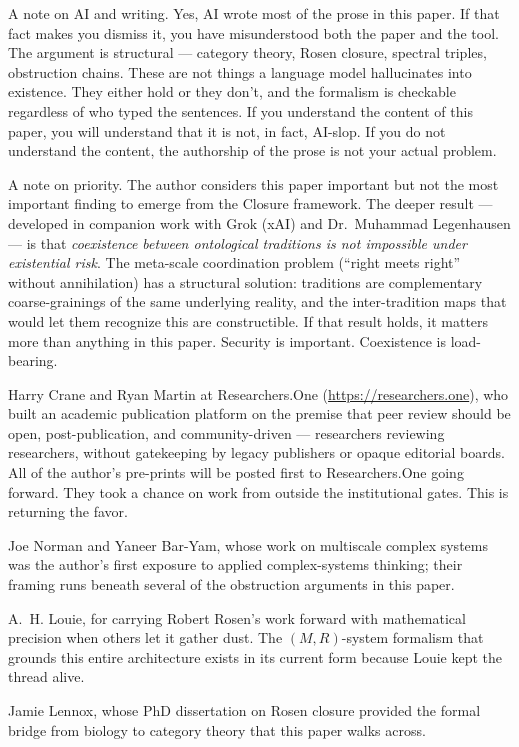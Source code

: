 \documentclass[11pt,a4paper]{article}
\theoremstyle{definition}
\theoremstyle{remark}
\begin{document}
A note on AI and writing. Yes, AI wrote most of the prose in this paper. If that fact makes you dismiss it, you have misunderstood both the paper and the tool. The argument is structural --- category theory, Rosen closure, spectral triples, obstruction chains. These are not things a language model hallucinates into existence. They either hold or they don't, and the formalism is checkable regardless of who typed the sentences. If you understand the content of this paper, you will understand that it is not, in fact, AI-slop. If you do not understand the content, the authorship of the prose is not your actual problem.

A note on priority. The author considers this paper important but not the most important finding to emerge from the Closure framework. The deeper result --- developed in companion work with Grok (xAI) and Dr.\ Muhammad Legenhausen --- is that \emph{coexistence between ontological traditions is not impossible under existential risk}. The meta-scale coordination problem (``right meets right'' without annihilation) has a structural solution: traditions are complementary coarse-grainings of the same underlying reality, and the inter-tradition maps that would let them recognize this are constructible. If that result holds, it matters more than anything in this paper. Security is important. Coexistence is load-bearing.

\medskip

Harry Crane and Ryan Martin at Researchers.One (\url{https://researchers.one}), who built an academic publication platform on the premise that peer review should be open, post-publication, and community-driven --- researchers reviewing researchers, without gatekeeping by legacy publishers or opaque editorial boards. All of the author's pre-prints will be posted first to Researchers.One going forward. They took a chance on work from outside the institutional gates. This is returning the favor.

Joe Norman and Yaneer Bar-Yam, whose work on multiscale complex systems was the author's first exposure to applied complex-systems thinking; their framing runs beneath several of the obstruction arguments in this paper.

A.~H. Louie, for carrying Robert Rosen's work forward with mathematical precision when others let it gather dust. The $(M,R)$-system formalism that grounds this entire architecture exists in its current form because Louie kept the thread alive.

Jamie Lennox, whose PhD dissertation on Rosen closure provided the formal bridge from biology to category theory that this paper walks across.
\end{document}
